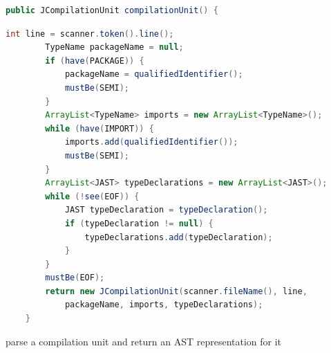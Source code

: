 \documentclass[8pt,a4paper,compress]{beamer}
\begin{document}
\begin{frame}[fragile]
\transdissolve

\begin{tcolorbox}[enhanced,drop shadow southwest,sharp corners,size=fbox,colback=white,fontlower=\small\ttfamily,collower=silver900]

\begin{lstlisting}[language=Java,style=focusin,backgroundcolor=\color{lime100}]
    public JCompilationUnit compilationUnit() {
\end{lstlisting}
\begin{lstlisting}[language=Java,style=focusout]
        int line = scanner.token().line();
        TypeName packageName = null;
        if (have(PACKAGE)) {
            packageName = qualifiedIdentifier();
            mustBe(SEMI);
        }
        ArrayList<TypeName> imports = new ArrayList<TypeName>();
        while (have(IMPORT)) {
            imports.add(qualifiedIdentifier());
            mustBe(SEMI);
        }
        ArrayList<JAST> typeDeclarations = new ArrayList<JAST>();
        while (!see(EOF)) {
            JAST typeDeclaration = typeDeclaration();
            if (typeDeclaration != null) {
                typeDeclarations.add(typeDeclaration);
            }
        }
        mustBe(EOF);
        return new JCompilationUnit(scanner.fileName(), line, 
            packageName, imports, typeDeclarations);
    }
\end{lstlisting}

\tcblower
\begin{minipage}[t][.25cm][t]{\textwidth}
parse a compilation unit and return an AST representation for it
\end{minipage}
\end{tcolorbox}
\end{frame}
\end{document}
